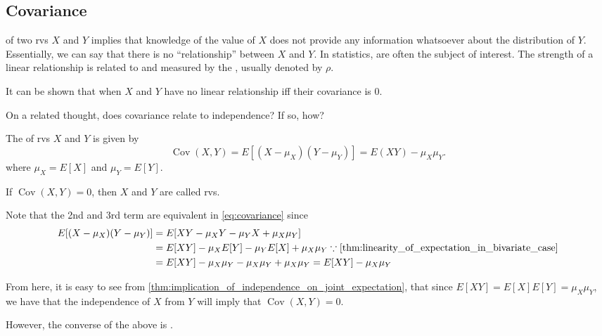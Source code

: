 \documentclass[notoc,notitlepage]{tufte-book}
\DeclareMathOperator{\Cov}{Cov }
\begin{document}
\subsection{Covariance}%
\label{sub:covariance}

 of two rvs $X$ and $Y$ implies that knowledge of the value of $X$ does not provide any information whatsoever about the distribution of $Y$. Essentially, we can say that there is no ``relationship'' between $X$ and $Y$. In statistics,  are often the subject of interest. The strength of a linear relationship is related to  and measured by the , usually denoted by $\rho$.

It can be shown that when $X$ and $Y$ have no linear relationship iff their covariance is $0$.

On a related thought, does covariance relate to independence? If so, how?

\begin{defn}[Covariance]
\label{defn:covariance}
  The  of rvs $X$ and $Y$ is given by
  \begin{equation}\label{eq:covariance}
    \Cov( X, Y ) = E[ (X - \mu_X) (Y - \mu_Y) ] = E(XY) - \mu_X \mu_Y.
  \end{equation}
  where $\mu_X = E[X]$ and $\mu_Y = E[Y]$.

  If $\Cov(X, Y) = 0$, then $X$ and $Y$ are called  rvs.
\end{defn}

\begin{note}
  Note that the 2nd and 3rd term are equivalent in \cref{eq:covariance} since
  \begin{align*}
    E[ (X - \mu_X) (Y - \mu_Y) ]
      &= E[ XY - \mu_X Y - \mu_Y X + \mu_X \mu_Y ] \\
      &= E[ XY ] - \mu_X E[Y] - \mu_Y E[X] + \mu_X \mu_Y \because \cref{thm:linearity_of_expectation_in_bivariate_case} \\
      &= E[ XY ] - \mu_X \mu_Y - \mu_X \mu_Y + \mu_X \mu_Y = E[ XY ] - \mu_X \mu_Y
  \end{align*}

  From here, it is easy to see from \cref{thm:implication_of_independence_on_joint_expectation}, that since $E[XY] = E[X] E[Y] = \mu_X \mu_Y$, we have that the independence of $X$ from $Y$ will imply that $\Cov(X, Y) = 0$.

  However, the converse of the above is .
\end{note}
\end{document}
